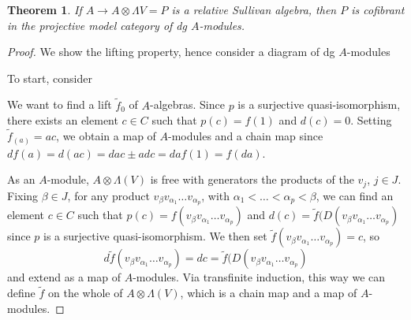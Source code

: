 \documentclass{scrartcl}
\theoremstyle{plain}
\newtheorem{theorem}{Theorem}[section]
\theoremstyle{definition}
\begin{document}
\begin{theorem}\label{thm:sullivan-is-cofibrant}
    If $A\to A\otimes \Lambda V=P$ is a relative Sullivan algebra, then $P$ is cofibrant in the projective model category of dg $A$-modules. 
\end{theorem}
\begin{proof}
    We show the lifting property, hence consider a diagram of dg $A$-modules
    \begin{center}
    \end{center}
    To start, consider 
    \begin{center}
    \end{center}
    We want to find a lift $\tilde f_0$ of $A$-algebras. Since $p$ is a surjective quasi-isomorphism, there exists an element $c\in C$ such that $p(c) = f(1)$ and $d(c) = 0$. Setting $\tilde f_(a) = ac$, we obtain a map of $A$-modules and a chain map since $df(a) = d(ac) = da c \pm a dc = da f(1) = f(da)$. 

    As an $A$-module, $A\otimes \Lambda(V)$ is free with generators the products of the $v_j$, $j\in J$. Fixing $\beta\in J$, for any product $v_\beta v_{\alpha_1}\dots v_{\alpha_p}$, with $\alpha_1< \dots< \alpha_p < \beta$, we can find an element $c\in C$ such that $p(c) = f(v_\beta v_{\alpha_1}\dots v_{\alpha_p})$ and $d(c) = \tilde f(D(v_\beta v_{\alpha_1}\dots v_{\alpha_p})$ since $p$ is a surjective quasi-isomorphism. We then set $\tilde f(v_\beta v_{\alpha_1}\dots v_{\alpha_p}) = c$, so $$d\tilde f(v_\beta v_{\alpha_1}\dots v_{\alpha_p}) = dc = \tilde f(D(v_\beta v_{\alpha_1}\dots v_{\alpha_p})$$ and extend as a map of $A$-modules. Via transfinite induction, this way we can define $\tilde f$ on the whole of $A\otimes \Lambda(V)$, which is a chain map and a map of $A$-modules.
\end{proof}
\end{document}
